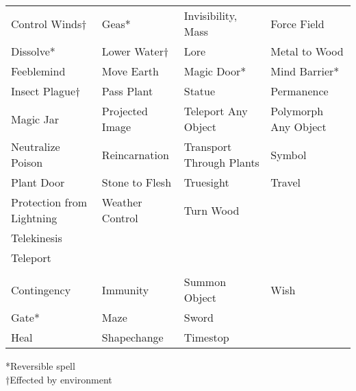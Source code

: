 \begin {table}[H]
\begin{tabularx}{\columnwidth}{YYYY}
	Control Winds† & Geas* & Invisibility, Mass & Force Field\\
	Dissolve* & Lower Water† & Lore & Metal to Wood\\
	Feeblemind & Move Earth & Magic Door* & Mind Barrier*\\
	Insect Plague† & Pass Plant & Statue & Permanence\\
	Magic Jar & Projected Image & Teleport Any Object & Polymorph Any Object\\
	Neutralize Poison & Reincarnation & Transport Through Plants & Symbol\\
	Plant Door & Stone to Flesh & Truesight & Travel\\
	Protection from Lightning & Weather Control & Turn Wood &\\
	Telekinesis & & &\\
	Teleport & & &\\
	\\
	Contingency & Immunity & Summon Object & Wish\\
	Gate* & Maze & Sword &\\
	Heal & Shapechange & Timestop &\
	\end {tabularx}
	*Reversible spell\\
	†Effected by environment
\end {table}

